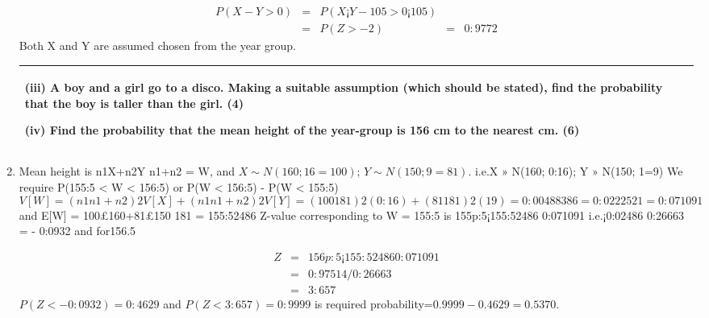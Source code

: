 \documentclass[a4paper,12pt]{article}
\begin{document}
\begin{enumerate}
\begin{eqnarray*}
P(X - Y > 0) &=& P(X¡Y - 10
5 > 0¡10
5 ) \\ &=& P(Z > - 2) &=& 0:9772 
\end{eqnarray*}
Both X and Y are assumed
chosen from the year group.


   \begin{table}[ht!]
  \centering
  \begin{tabular}{|p{15cm}|}
  \hline
(iii) A boy and a girl go to a disco.  Making a suitable assumption (which should be stated), find the probability that the boy is taller than the girl. (4) 
 
(iv) Find the probability that the mean height of the year-group is 156 cm to the nearest cm. (6)   \\    \hline
   \end{tabular}
 \end{table}
\item  Mean height is n1X+n2Y
n1+n2
= W, and $X \sim N(160; 16=100)$; $Y \sim N(150; 9=81)$. i.e.X »
N(160; 0:16); Y » N(150; 1=9) We require P(155:5 < W < 156:5) or P(W < 156:5) - 
P(W < 155:5)
\[
V [W] = ( n1
n1+n2
)2V [X] + ( n1
n1+n2
)2V [Y ] = ( 100
181 )2(0:16) + ( 81
181 )2( 1
9 ) = 0:00488386 =
0:0222521 = 0:071091
\]and E[W] = 100£160+81£150
181 = 155:52486
Z-value corresponding to W = 155:5 is 155p:5¡155:52486
0:071091
i.e.¡0:02486
0:26663 = - 0:0932 and for156.5

\begin{eqnarray*}
Z &=& 156p:5¡155:52486
0:071091 \\ 
&=& 0:97514 /  0:26663 \\ 
&=& 3:657
\end{eqnarray*}
$P(Z < - 0:0932) = 0:4629$ and $P(Z < 3:657) = 0:9999$ is required probability=$0.9999-
0.4629=0.5370$.

\end{enumerate}
\end{document}

